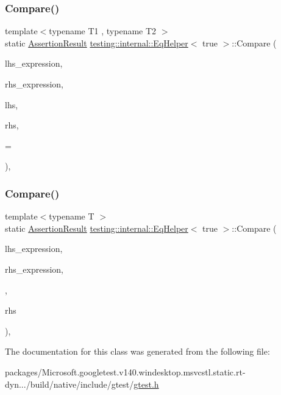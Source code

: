 \subsubsection{\texorpdfstring{Compare()}{Compare()}\hspace{0.1cm}{\footnotesize\ttfamily [1/2]}}
{\footnotesize\ttfamily template$<$typename T1 , typename T2 $>$ \\
static \mbox{\hyperlink{classtesting_1_1_assertion_result}{Assertion\+Result}} \mbox{\hyperlink{classtesting_1_1internal_1_1_eq_helper}{testing\+::internal\+::\+Eq\+Helper}}$<$ true $>$\+::Compare (\begin{DoxyParamCaption}\item[{const char $\ast$}]{lhs\+\_\+expression,  }\item[{const char $\ast$}]{rhs\+\_\+expression,  }\item[{const T1 \&}]{lhs,  }\item[{const T2 \&}]{rhs,  }\item[{typename \mbox{\hyperlink{structtesting_1_1internal_1_1_enable_if}{Enable\+If}}$<$!\mbox{\hyperlink{structtesting_1_1internal_1_1is__pointer}{is\+\_\+pointer}}$<$ T2 $>$\+::value $>$\+::type $\ast$}]{ = {} }\end{DoxyParamCaption})\hspace{0.3cm}{\ttfamily [inline]}, {\ttfamily [static]}}

\mbox{\label{classtesting_1_1internal_1_1_eq_helper_3_01true_01_4_a6f292601a68c8f0d49e6d48bd309b900}} 
\subsubsection{\texorpdfstring{Compare()}{Compare()}\hspace{0.1cm}{\footnotesize\ttfamily [2/2]}}
{\footnotesize\ttfamily template$<$typename T $>$ \\
static \mbox{\hyperlink{classtesting_1_1_assertion_result}{Assertion\+Result}} \mbox{\hyperlink{classtesting_1_1internal_1_1_eq_helper}{testing\+::internal\+::\+Eq\+Helper}}$<$ true $>$\+::Compare (\begin{DoxyParamCaption}\item[{const char $\ast$}]{lhs\+\_\+expression,  }\item[{const char $\ast$}]{rhs\+\_\+expression,  }\item[{Secret $\ast$}]{,  }\item[{T $\ast$}]{rhs }\end{DoxyParamCaption})\hspace{0.3cm}{\ttfamily [inline]}, {\ttfamily [static]}}



The documentation for this class was generated from the following file\+:\begin{DoxyCompactItemize}
\item 
packages/\+Microsoft.\+googletest.\+v140.\+windesktop.\+msvcstl.\+static.\+rt-\/dyn.../build/native/include/gtest/\mbox{\hyperlink{gtest_8h}{gtest.\+h}}\end{DoxyCompactItemize}
